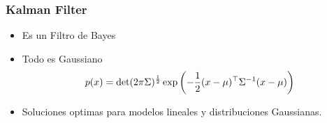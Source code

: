 \begin{frame}
	\frametitle{Kalman Filter}
	
	\begin{itemize}
		\item Es un Filtro de Bayes
		\item Todo es Gaussiano
		\begin{equation*}
			p(x)=\det(2\pi\Sigma)^{\frac{1}{2}} \exp\left(-\dfrac{1}{2} (x - \mu )^{\top} {\Sigma}^{-1} (x - \mu )  \right)
		\end{equation*}
		
		\item Soluciones optimas para modelos lineales y distribuciones Gaussianas.
	\end{itemize}

	\begin{figure}[!h]
		\centering
	\end{figure}
\end{frame}


